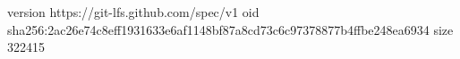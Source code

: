 version https://git-lfs.github.com/spec/v1
oid sha256:2ac26e74c8eff1931633e6af1148bf87a8cd73c6c97378877b4ffbe248ea6934
size 322415
